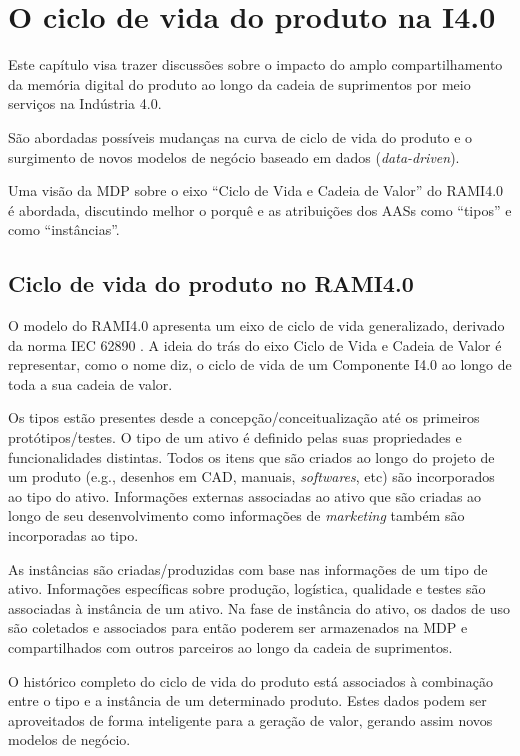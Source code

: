 \chapter{O ciclo de vida do produto na I4.0}
\label{cha:ciclo-de-vida}
	
	Este capítulo visa trazer discussões sobre o impacto do amplo compartilhamento da memória digital do produto ao longo da cadeia de suprimentos por meio serviços na Indústria 4.0.
	
	São abordadas possíveis mudanças na curva de ciclo de vida do produto e o surgimento de novos modelos de negócio baseado em dados (\textit{data-driven}).
	
	Uma visão da MDP sobre o eixo ``Ciclo de Vida e Cadeia de Valor'' do RAMI4.0 é abordada, discutindo melhor o porquê e as atribuições dos AASs como ``tipos'' e como ``instâncias''.
	

\section{Ciclo de vida do produto no RAMI4.0}

	O modelo do RAMI4.0 apresenta um eixo de ciclo de vida generalizado, derivado da norma IEC 62890 \cite{adolphs2015rami}. A ideia do trás do eixo Ciclo de Vida e Cadeia de Valor é representar, como o nome diz, o ciclo de vida de um Componente I4.0 ao longo de toda a sua cadeia de valor.
	
	Os tipos estão presentes desde a concepção/conceitualização até os primeiros protótipos/testes. O tipo de um ativo é definido pelas suas propriedades e funcionalidades distintas. Todos os itens que são criados ao longo do projeto de um produto (e.g., desenhos em CAD, manuais, \textit{softwares}, etc) são incorporados ao tipo do ativo. Informações externas associadas ao ativo que são criadas ao longo de seu desenvolvimento como informações de \textit{marketing} também são incorporadas ao tipo.
	
	As instâncias são criadas/produzidas com base nas informações de um tipo de ativo. Informações específicas sobre produção, logística, qualidade e testes são associadas à instância de um ativo. Na fase de instância do ativo, os dados de uso são coletados e associados para então poderem ser armazenados na MDP e compartilhados com outros parceiros ao longo da cadeia de suprimentos. 
	
	O histórico completo do ciclo de vida do produto está associados à combinação entre o tipo e a instância de um determinado produto. Estes dados podem ser aproveitados de forma inteligente para a geração de valor, gerando assim novos modelos de negócio.
	
